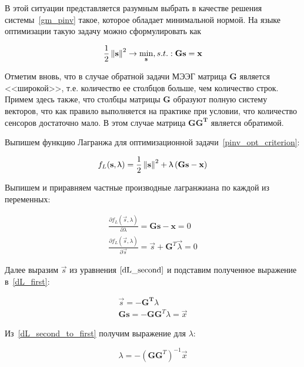 В этой ситуации представляется разумным выбрать в качестве решения системы~\ref{gm_pinv}
такое, которое обладает минимальной нормой.
На языке оптимизации такую задачу можно сформулировать как

\begin{equation}
    \frac{1}{2}\left\lVert\mathbf{s}\right\rVert^2 \rightarrow \underset{\mathbf{s}}{\min},
    s.t.: \mathbf{G} \mathbf{s} = \mathbf{x}
    \label{pinv_opt_criterion}
\end{equation}

Отметим вновь, что в случае обратной задачи МЭЭГ матрица $\mathbf{G}$ является
<<широкой>>, т.е.  количество ее столбцов больше, чем количество строк. Примем
здесь также, что столбцы матрицы $\mathbf{G}$ образуют полную систему векторов,
что как правило выполняется на практике при условии, что количество сенсоров
достаточно мало. В этом случае матрица $\mathbf{GG^T}$ является обратимой.

Выпишем функцию Лагранжа для оптимизационной задачи~\ref{pinv_opt_criterion}:

\begin{equation}
    f_L(\mathbf{s}, \uplambda) = \frac{1}{2}\left\lVert\mathbf{s}\right\rVert^2 + \uplambda \left(\mathbf{Gs - x}\right)
\end{equation}

Выпишем и приравняем частные производные лагранжиана по каждой из переменных:

\begin{gather}
    \frac{\partial f_L(\vec{s}, \lambda)}{\partial \lambda} = \mathbf{Gs - x} = 0
    \label{dL_first} \\
    \frac{\partial f_L(\vec{s}, \lambda)}{\partial \vec{s}} = \vec{s}
    + \mathbf{G}^T\vec{\lambda} = 0
    \label{dL_second}
\end{gather}

Далее выразим $\vec{s}$ из уравнения $\ref{dL_second}$ и подставим
полученное выражение в~\ref{dL_first}:

\begin{gather}
    \vec{s} = - \mathbf{G^T}\lambda
    \label{dL_second_s_expressed}\\
    \mathbf{Gs} = - \mathbf{G} \mathbf{G}^T\lambda = \vec{x}
    \label{dL_second_to_first}
\end{gather}

Из~\ref{dL_second_to_first} получим выражение для $\lambda$:

\begin{equation}
    \lambda = - {(\mathbf{G}\mathbf{G}^T)}^{-1}\vec{x}
    \label{pinv_lambda_expression}
\end{equation}

